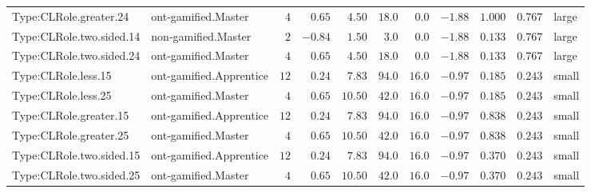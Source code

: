 \documentclass[6pt,a4paper]{article}
\begin{document}
{\begin{longtable}{llrrrrrrrrl}
Type:CLRole.greater.24&ont-gamified.Master&$ 4$&$ 0.65$&$ 4.50$&$ 18.0$&$ 0.0$&$-1.88$&$1.000$&$0.767$&large\tabularnewline
Type:CLRole.two.sided.14&non-gamified.Master&$ 2$&$-0.84$&$ 1.50$&$  3.0$&$ 0.0$&$-1.88$&$0.133$&$0.767$&large\tabularnewline
Type:CLRole.two.sided.24&ont-gamified.Master&$ 4$&$ 0.65$&$ 4.50$&$ 18.0$&$ 0.0$&$-1.88$&$0.133$&$0.767$&large\tabularnewline
Type:CLRole.less.15&ont-gamified.Apprentice&$12$&$ 0.24$&$ 7.83$&$ 94.0$&$16.0$&$-0.97$&$0.185$&$0.243$&small\tabularnewline
Type:CLRole.less.25&ont-gamified.Master&$ 4$&$ 0.65$&$10.50$&$ 42.0$&$16.0$&$-0.97$&$0.185$&$0.243$&small\tabularnewline
Type:CLRole.greater.15&ont-gamified.Apprentice&$12$&$ 0.24$&$ 7.83$&$ 94.0$&$16.0$&$-0.97$&$0.838$&$0.243$&small\tabularnewline
Type:CLRole.greater.25&ont-gamified.Master&$ 4$&$ 0.65$&$10.50$&$ 42.0$&$16.0$&$-0.97$&$0.838$&$0.243$&small\tabularnewline
\newpage
Type:CLRole.two.sided.15&ont-gamified.Apprentice&$12$&$ 0.24$&$ 7.83$&$ 94.0$&$16.0$&$-0.97$&$0.370$&$0.243$&small\tabularnewline
Type:CLRole.two.sided.25&ont-gamified.Master&$ 4$&$ 0.65$&$10.50$&$ 42.0$&$16.0$&$-0.97$&$0.370$&$0.243$&small\tabularnewline
\hline
\end{longtable}}
\end{document}
